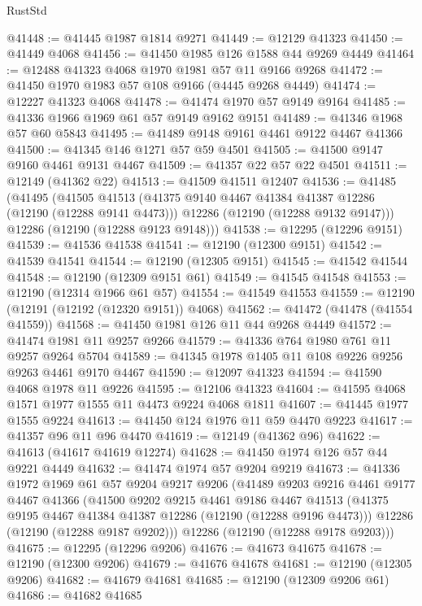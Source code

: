 \begin{lexlean}{RustStd}
\begin{coremodule}
@41448 := @41445 @1987 @1814 @9271
@41449 := @12129 @41323
@41450 := @41449 @4068
@41456 := @41450 @1985 @126 @1588 @44 @9269 @4449
@41464 := @12488 @41323 @4068 @1970 @1981 @57 @11 @9166 @9268
@41472 := @41450 @1970 @1983 @57 @108 @9166 (@4445 @9268 @4449)
@41474 := @12227 @41323 @4068
@41478 := @41474 @1970 @57 @9149 @9164
@41485 := @41336 @1966 @1969 @61 @57 @9149 @9162 @9151
@41489 := @41346 @1968 @57 @60 @5843
@41495 := @41489 @9148 @9161 @4461 @9122 @4467 @41366
@41500 := @41345 @146 @1271 @57 @59 @4501
@41505 := @41500 @9147 @9160 @4461 @9131 @4467
@41509 := @41357 @22 @57 @22 @4501
@41511 := @12149 (@41362 @22)
@41513 := @41509 @41511 @12407
@41536 := @41485
    (@41495
      (@41505
        @41513
        (@41375 @9140 @4467 @41384 @41387 @12286 (@12190 (@12288 @9141 @4473)))
        @12286
        (@12190 (@12288 @9132 @9147)))
      @12286
      (@12190 (@12288 @9123 @9148)))
@41538 := @12295 (@12296 @9151)
@41539 := @41536 @41538
@41541 := @12190 (@12300 @9151)
@41542 := @41539 @41541
@41544 := @12190 (@12305 @9151)
@41545 := @41542 @41544
@41548 := @12190 (@12309 @9151 @61)
@41549 := @41545 @41548
@41553 := @12190 (@12314 @1966 @61 @57)
@41554 := @41549 @41553
@41559 := @12190 (@12191 (@12192 (@12320 @9151)) @4068)
@41562 := @41472 (@41478 (@41554 @41559))
@41568 := @41450 @1981 @126 @11 @44 @9268 @4449
@41572 := @41474 @1981 @11 @9257 @9266
@41579 := @41336 @764 @1980 @761 @11 @9257 @9264 @5704
@41589 := @41345 @1978 @1405 @11 @108 @9226 @9256 @9263 @4461 @9170 @4467
@41590 := @12097 @41323
@41594 := @41590 @4068 @1978 @11 @9226
@41595 := @12106 @41323
@41604 := @41595 @4068 @1571 @1977 @1555 @11 @4473 @9224 @4068 @1811
@41607 := @41445 @1977 @1555 @9224
@41613 := @41450 @124 @1976 @11 @59 @4470 @9223
@41617 := @41357 @96 @11 @96 @4470
@41619 := @12149 (@41362 @96)
@41622 := @41613 (@41617 @41619 @12274)
@41628 := @41450 @1974 @126 @57 @44 @9221 @4449
@41632 := @41474 @1974 @57 @9204 @9219
@41673 := @41336
    @1972
    @1969
    @61
    @57
    @9204
    @9217
    @9206
    (@41489
      @9203
      @9216
      @4461
      @9177
      @4467
      @41366
      (@41500
        @9202
        @9215
        @4461
        @9186
        @4467
        @41513
        (@41375 @9195 @4467 @41384 @41387 @12286 (@12190 (@12288 @9196 @4473)))
        @12286
        (@12190 (@12288 @9187 @9202)))
      @12286
      (@12190 (@12288 @9178 @9203)))
@41675 := @12295 (@12296 @9206)
@41676 := @41673 @41675
@41678 := @12190 (@12300 @9206)
@41679 := @41676 @41678
@41681 := @12190 (@12305 @9206)
@41682 := @41679 @41681
@41685 := @12190 (@12309 @9206 @61)
@41686 := @41682 @41685

\end{coremodule}
\end{lexlean}
